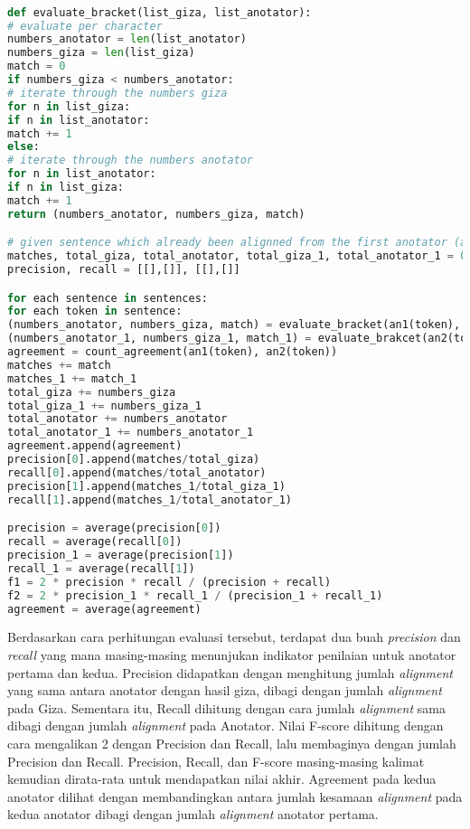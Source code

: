 \begin{lstlisting}[language=Python, caption={Word Alignment Evaluation}, label={word-alignment-evaluation}]

def evaluate_bracket(list_giza, list_anotator):
# evaluate per character
numbers_anotator = len(list_anotator)
numbers_giza = len(list_giza)
match = 0
if numbers_giza < numbers_anotator:
# iterate through the numbers giza
for n in list_giza:
if n in list_anotator:
match += 1
else:
# iterate through the numbers anotator
for n in list_anotator:
if n in list_giza:
match += 1
return (numbers_anotator, numbers_giza, match)

# given sentence which already been alignned from the first anotator (an1), second anotator(an2), and giza(giza)
matches, total_giza, total_anotator, total_giza_1, total_anotator_1 = 0, 0, 0, 0, 0
precision, recall = [[],[]], [[],[]]

for each sentence in sentences:
for each token in sentence:
(numbers_anotator, numbers_giza, match) = evaluate_bracket(an1(token), giza(token))
(numbers_anotator_1, numbers_giza_1, match_1) = evaluate_brakcet(an2(token), giza(token))
agreement = count_agreement(an1(token), an2(token))
matches += match
matches_1 += match_1
total_giza += numbers_giza
total_giza_1 += numbers_giza_1
total_anotator += numbers_anotator
total_anotator_1 += numbers_anotator_1
agreement.append(agreement)
precision[0].append(matches/total_giza)
recall[0].append(matches/total_anotator)
precision[1].append(matches_1/total_giza_1)
recall[1].append(matches_1/total_anotator_1)

precision = average(precision[0])
recall = average(recall[0])
precision_1 = average(precision[1])
recall_1 = average(recall[1])
f1 = 2 * precision * recall / (precision + recall)
f2 = 2 * precision_1 * recall_1 / (precision_1 + recall_1)
agreement = average(agreement)	

\end{lstlisting}

Berdasarkan cara perhitungan evaluasi tersebut, terdapat dua buah \textit{precision} dan \textit{recall} yang mana masing-masing menunjukan indikator penilaian untuk anotator pertama dan kedua. Precision didapatkan dengan menghitung jumlah \textit{alignment} yang sama antara anotator dengan hasil giza, dibagi dengan jumlah \textit{alignment} pada Giza. Sementara itu, Recall dihitung dengan cara jumlah \textit{alignment} sama dibagi dengan jumlah \textit{alignment} pada Anotator. Nilai F-score dihitung dengan cara mengalikan 2 dengan Precision dan Recall, lalu membaginya dengan jumlah Precision dan Recall. Precision, Recall, dan F-score masing-masing kalimat kemudian dirata-rata untuk mendapatkan nilai akhir. Agreement pada kedua anotator dilihat dengan membandingkan antara jumlah kesamaan \textit{alignment} pada kedua anotator dibagi dengan jumlah \textit{alignment} anotator pertama.


